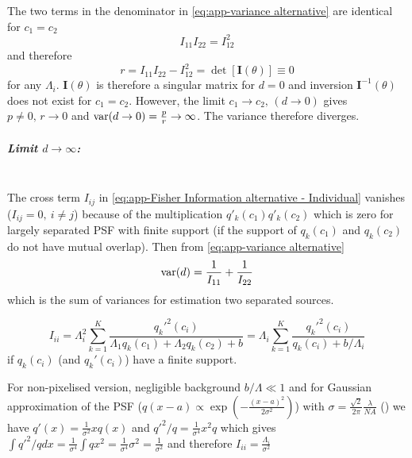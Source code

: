 The two terms in the denominator in \autoref{eq:app-variance alternative} are identical for $c_1=c_2$
\begin{equation}
	I_{11}I_{22}=I_{12}^2
\end{equation}
%
and therefore 
%
\begin{equation*}
	r=I_{11}I_{22}-I_{12}^2=\det\left[\bm{I}(\theta)\right] \equiv 0
\end{equation*}
%
for any $\Lambda_i$. $\bm{I}(\theta)$ is therefore a singular matrix for $d=0$ and inversion $\bm{I}^{-1}(\theta)$ does not exist for $c_1=c_2$. However,  the limit $c_1\rightarrow c_2,\,(d\rightarrow0)$ gives $p\neq0,\, r\rightarrow0$ and $\mathrm{var}(d\rightarrow0)=\frac{p}{r}\rightarrow\infty$. The variance therefore diverges. 

\subparagraph*{Limit $d\rightarrow\infty$:}\ \\
The cross term $I_{ij}$ in \autoref{eq:app-Fisher Information alternative - Individual} vanishes ($I_{ij}=0,\: i\neq j$) because of the multiplication $q'_k(c_1)q'_k(c_2)$ which is zero for largely separated PSF with finite support (if the support of $q_k(c_1)$ and $q_k(c_2)$ do not have mutual overlap). Then from \autoref{eq:app-variance alternative} 
%
\begin{equation}
	\mathrm{var}(d)=\frac{1}{I_{11}}+\frac{1}{I_{22}}
\end{equation}
%
which is the sum of variances for estimation two separated sources.

\begin{equation}
	I_{ii}=\Lambda_i^2\sum_{k=1}^K\frac{q_k'^2(c_i)}{\Lambda_1q_k(c_1)+\Lambda_2q_k(c_2)+b}=\Lambda_i\sum_{k=1}^K\frac{q_k'^2(c_i)}{q_k(c_i)+b/\Lambda_i}
\end{equation}
%
if $q_k(c_i)$ (and $q_k'(c_i)$) have a finite support.

For non-pixelised version, negligible background $b/\Lambda\ll1$ and for Gaussian approximation of the PSF ($q(x-a)\propto\exp\left(-\frac{(x-a)^2}{2\sigma^2}\right)$) with
$\sigma=\frac{\sqrt{2}}{2\pi}\frac{\lambda}{NA}$ (\cite{Zhang2007}) we have $q'(x)=\frac{1}{\sigma^2}xq(x)$ and $q'^2/q=\frac{1}{\sigma^4}x^2q$ which gives $\int q'^2/qdx=\frac{1}{\sigma^4}\int qx^2=\frac{1}{\sigma^4}\sigma^2=\frac{1}{\sigma^2}$ and therefore $I_{ii}=\frac{\Lambda_i}{\sigma^2}$ 

